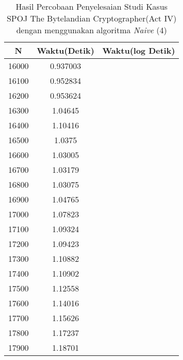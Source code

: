 \begin{table}[H]
\centering
\caption {Hasil Percobaan Penyelesaian Studi Kasus SPOJ The Bytelandian Cryptographer(Act IV) dengan menggunakan algoritma \textit{Naive} (4)}
\begin{tabular}{|c|c|c|}\hline
N&Waktu(Detik)&Waktu(log Detik)\\ \hline
16000&0.937003\\ \hline
16100&0.952834\\ \hline
16200&0.953624\\ \hline
16300&1.04645\\ \hline
16400&1.10416\\ \hline
16500&1.0375\\ \hline
16600&1.03005\\ \hline
16700&1.03179\\ \hline
16800&1.03075\\ \hline
16900&1.04765\\ \hline
17000&1.07823\\ \hline
17100&1.09324\\ \hline
17200&1.09423\\ \hline
17300&1.10882\\ \hline
17400&1.10902\\ \hline
17500&1.12558\\ \hline
17600&1.14016\\ \hline
17700&1.15626\\ \hline
17800&1.17237\\ \hline
17900&1.18701\\ \hline
\end{tabular}
\label{tab:res8}
\end{table}
